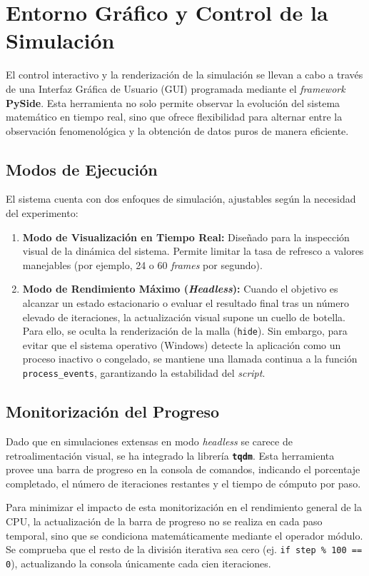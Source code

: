 \documentclass[12pt,a4paper]{article}
\begin{document}
\section{Entorno Gráfico y Control de la Simulación}

El control interactivo y la renderización de la simulación se llevan a cabo a través de una Interfaz Gráfica de Usuario (GUI) programada mediante el \textit{framework} \textbf{PySide}. Esta herramienta no solo permite observar la evolución del sistema matemático en tiempo real, sino que ofrece flexibilidad para alternar entre la observación fenomenológica y la obtención de datos puros de manera eficiente.

\subsection{Modos de Ejecución}
El sistema cuenta con dos enfoques de simulación, ajustables según la necesidad del experimento:
\begin{enumerate}
    \item \textbf{Modo de Visualización en Tiempo Real:} Diseñado para la inspección visual de la dinámica del sistema. Permite limitar la tasa de refresco a valores manejables (por ejemplo, 24 o 60 \textit{frames} por segundo).
    \item \textbf{Modo de Rendimiento Máximo (\textit{Headless}):} Cuando el objetivo es alcanzar un estado estacionario o evaluar el resultado final tras un número elevado de iteraciones, la actualización visual supone un cuello de botella. Para ello, se oculta la renderización de la malla (\texttt{hide}). Sin embargo, para evitar que el sistema operativo (Windows) detecte la aplicación como un proceso inactivo o congelado, se mantiene una llamada continua a la función \texttt{process\_events}, garantizando la estabilidad del \textit{script}.
\end{enumerate}

\subsection{Monitorización del Progreso}
Dado que en simulaciones extensas en modo \textit{headless} se carece de retroalimentación visual, se ha integrado la librería \textbf{\texttt{tqdm}}. Esta herramienta provee una barra de progreso en la consola de comandos, indicando el porcentaje completado, el número de iteraciones restantes y el tiempo de cómputo por paso. 

Para minimizar el impacto de esta monitorización en el rendimiento general de la CPU, la actualización de la barra de progreso no se realiza en cada paso temporal, sino que se condiciona matemáticamente mediante el operador módulo. Se comprueba que el resto de la división iterativa sea cero (ej. \texttt{if step \% 100 == 0}), actualizando la consola únicamente cada cien iteraciones.
\end{document}
